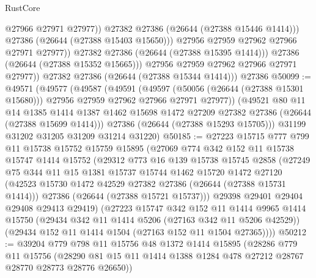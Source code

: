 \begin{lexlean}{RustCore}
\begin{coremodule}
                          @27966
                          @27971
                          @27977))
                      @27382
                      @27386
                      (@26644 (@27388 @15446 @1414)))
                    @27386
                    (@26644 (@27388 @15403 @15650)))
                  @27956
                  @27959
                  @27962
                  @27966
                  @27971
                  @27977))
              @27382
              @27386
              (@26644 (@27388 @15395 @1414)))
            @27386
            (@26644 (@27388 @15352 @15665)))
          @27956
          @27959
          @27962
          @27966
          @27971
          @27977))
      @27382
      @27386
      (@26644 (@27388 @15344 @1414)))
    @27386
@50099 := @49571
    (@49577
      (@49587
        (@49591
          (@49597
            (@50056 (@26644 (@27388 @15301 @15680)))
            @27956
            @27959
            @27962
            @27966
            @27971
            @27977))
        (@49521
          @80
          @11
          @14
          @1385
          @1414
          @1387
          @1462
          @15698
          @1472
          @27209
          @27382
          @27386
          (@26644 (@27388 @15699 @1414)))
        @27386
        (@26644 (@27388 @15293 @15705)))
      @31199
      @31202
      @31205
      @31209
      @31214
      @31220)
@50185 := @27223
    @15715
    @777
    @799
    @11
    @15738
    @15752
    @15759
    @15895
    (@27069
      @774
      @342
      @152
      @11
      @15738
      @15747
      @1414
      @15752
      (@29312
        @773
        @16
        @139
        @15738
        @15745
        @2858
        (@27249
          @75
          @344
          @11
          @15
          @1381
          @15737
          @15744
          @1462
          @15720
          @1472
          @27120
          (@42523 @15730 @1472 @42529 @27382 @27386 (@26644 (@27388 @15731 @1414)))
          @27386
          (@26644 (@27388 @15721 @15737)))
        @29398
        @29401
        @29404
        @29408
        @29413
        @29419)
      (@27223
        @15747
        @342
        @152
        @11
        @1414
        @9965
        @1414
        @15750
        (@29434 @342 @11 @1414 @5206 (@27163 @342 @11 @5206 @42529))
        (@29434 @152 @11 @1414 @1504 (@27163 @152 @11 @1504 @27365))))
@50212 := @39204
    @779
    @798
    @11
    @15756
    @48
    @1372
    @1414
    @15895
    (@28286
      @779
      @11
      @15756
      (@28290 @81 @15 @11 @1414 @1388 @1284 @478 @27212 @28767 @28770 @28773 @28776 @26650))

\end{coremodule}
\end{lexlean}
